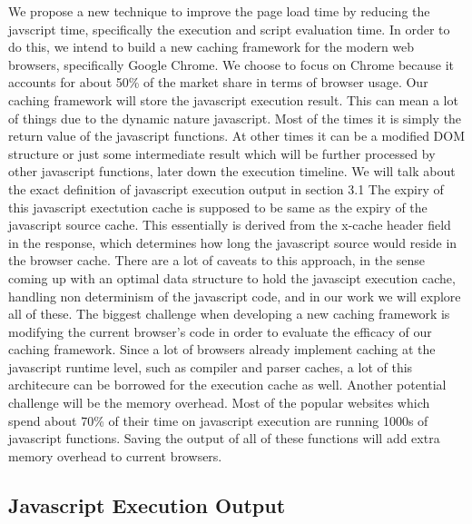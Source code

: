 We propose a new technique to improve the page load time by reducing the javscript time,
specifically the execution and script evaluation time.  %
In order to do this, we intend to build a new caching framework for the modern web browsers,
specifically Google Chrome. We choose to focus on Chrome because it accounts for about 50\% of the market share in terms of browser
usage. Our caching framework will store the javascript execution result. This can mean a lot of things
due to the dynamic nature javascript. Most of the times it is simply the return value of the 
javascript functions. At other times it can be a modified DOM structure or just some intermediate result which
will be further processed by other javascript functions, later down the execution timeline. 
We will talk about the exact definition of javascript execution output in section 3.1
The expiry of this javascript exectution cache is supposed to be same as the expiry of the javascript source cache.
This essentially is derived from the x-cache header field in the response, which determines how long
the javascript source would reside in the browser cache. 
There are a lot of caveats to this approach, in the sense coming up with an optimal data structure to hold the 
javascipt execution cache, handling non determinism of the javascript code, and in our work we will explore all of these. %
The biggest challenge when developing a new caching framework is modifying the current browser's code 
in order to evaluate the efficacy of our caching framework. Since a lot of browsers already implement caching
at the javascript runtime level, such as compiler and parser caches, a lot of this architecure can be borrowed
for the execution cache as well. 
Another potential challenge will be the memory overhead. Most of the popular websites which spend about 70\% 
of their time on javascript execution are running 1000s of javascript functions. Saving the output of all 
of these functions will add extra memory overhead to current browsers. 

\subsection{Javascript Execution Output}
\label{sec:exec-output}

